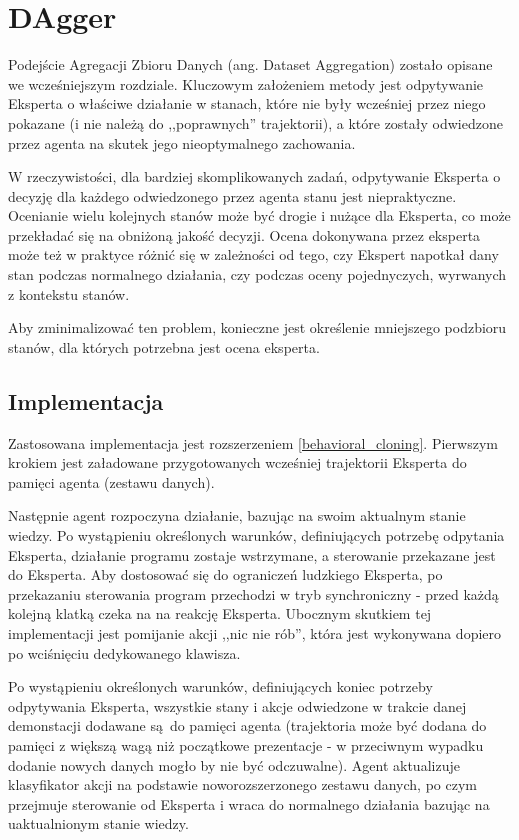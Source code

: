 \section{DAgger}\label{dagger}

Podejście Agregacji Zbioru Danych (ang. Dataset Aggregation) \cite{DBLP:journals/corr/abs-1011-0686} zostało opisane we wcześniejszym rozdziale. Kluczowym założeniem metody jest odpytywanie Eksperta o właściwe działanie w stanach, które nie były wcześniej przez niego pokazane (i nie należą do ,,poprawnych'' trajektorii), a które zostały odwiedzone przez agenta na skutek jego nieoptymalnego zachowania.

W rzeczywistości, dla bardziej skomplikowanych zadań, odpytywanie Eksperta o decyzję dla każdego odwiedzonego przez agenta stanu jest niepraktyczne. Ocenianie wielu kolejnych stanów może być drogie i nużące dla Eksperta, co może przekładać się na obniżoną jakość decyzji. Ocena dokonywana przez eksperta może też w praktyce różnić się w zależności od tego, czy Ekspert napotkał dany stan podczas normalnego działania, czy podczas oceny pojednyczych, wyrwanych z kontekstu stanów.

Aby zminimalizować ten problem, konieczne jest określenie mniejszego podzbioru stanów, dla których potrzebna jest ocena eksperta.


\subsection{Implementacja} 
Zastosowana implementacja jest rozszerzeniem \ref{behavioral_cloning}. Pierwszym krokiem jest załadowane przygotowanych wcześniej trajektorii Eksperta do pamięci agenta (zestawu danych).

Następnie agent rozpoczyna działanie, bazując na swoim aktualnym stanie wiedzy. Po wystąpieniu określonych warunków, definiujących potrzebę odpytania Eksperta, działanie programu zostaje wstrzymane, a sterowanie przekazane jest do Eksperta. Aby dostosować się do ograniczeń ludzkiego Eksperta, po przekazaniu sterowania program przechodzi w tryb synchroniczny - przed każdą kolejną klatką czeka na na reakcję Eksperta. Ubocznym skutkiem tej implementacji jest pomijanie akcji ,,nic nie rób'', która jest wykonywana dopiero po wciśnięciu dedykowanego klawisza.

Po wystąpieniu określonych warunków, definiujących koniec potrzeby odpytywania Eksperta, wszystkie stany i akcje odwiedzone w trakcie danej demonstacji dodawane są do pamięci agenta (trajektoria może być dodana do pamięci z większą wagą niż początkowe prezentacje - w przeciwnym wypadku dodanie nowych danych mogło by nie być odczuwalne). Agent aktualizuje klasyfikator akcji na podstawie noworozszerzonego zestawu danych, po czym przejmuje sterowanie od Eksperta i wraca do normalnego działania bazując na uaktualnionym stanie wiedzy.

